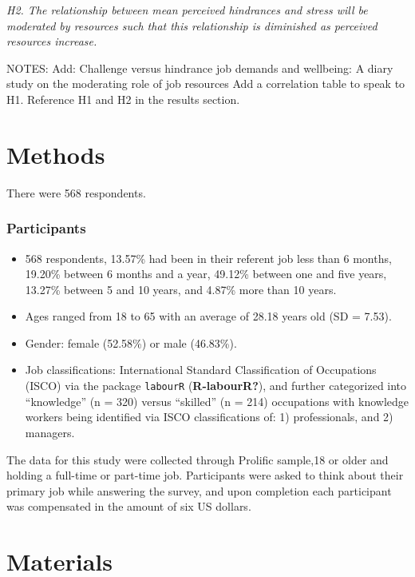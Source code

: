 \documentclass[
  english,
  man]{apa6}
\providecommand{\tightlist}{%
  \setlength{\itemsep}{0pt}\setlength{\parskip}{0pt}}
\begin{document}
\emph{H2. The relationship between mean perceived hindrances and stress will be moderated by resources such that this relationship is diminished as perceived resources increase.}

NOTES:
Add: Challenge versus hindrance job demands and wellbeing: A diary study on the moderating role of job resources
Add a correlation table to speak to H1. Reference H1 and H2 in the results section.

\hypertarget{methods}{%
\section{Methods}\label{methods}}

There were 568 respondents.

\hypertarget{participants}{%
\subsubsection{Participants}\label{participants}}

\begin{itemize}
\tightlist
\item
  568 respondents, 13.57\% had been in their referent job less than 6 months, 19.20\% between 6 months and a year, 49.12\% between one and five years, 13.27\% between 5 and 10 years, and 4.87\% more than 10 years.
\item
  Ages ranged from 18 to 65 with an average of 28.18 years old (SD = 7.53).
\item
  Gender: female (52.58\%) or male (46.83\%).
\item
  Job classifications: International Standard Classification of Occupations (ISCO) via the package \texttt{labourR} (\textbf{R-labourR?}), and further categorized into ``knowledge'' (n = 320) versus ``skilled'' (n = 214) occupations with knowledge workers being identified via ISCO classifications of: 1) professionals, and 2) managers.
\end{itemize}

The data for this study were collected through Prolific sample,18 or older and holding a full-time or part-time job. Participants were asked to think about their primary job while answering the survey, and upon completion each participant was compensated in the amount of six US dollars.

\hypertarget{materials}{%
\section{Materials}\label{materials}}
\end{document}
